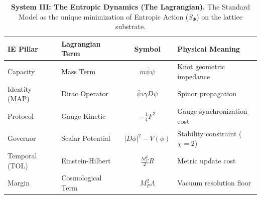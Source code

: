 \begin{table}[h]
\centering
\caption{\textbf{System III: The Entropic Dynamics (The Lagrangian).} The Standard Model as the unique minimization of Entropic Action ($S_\Phi$) on the lattice substrate.}
\label{tab:system_lagrangian}
\renewcommand{\arraystretch}{1.5}
\setlength{\tabcolsep}{6pt}
\begin{tabular}{@{} l l c l @{}}
\hline
\textbf{IE Pillar} & \textbf{Lagrangian Term} & \textbf{Symbol} & \textbf{Physical Meaning} \\
\hline
Capacity & Mass Term & $m\bar{\psi}\psi$ & Knot geometric impedance \\
Identity (MAP) & Dirac Operator & $\bar{\psi}i\gamma D\psi$ & Spinor propagation \\
Protocol & Gauge Kinetic & $-\frac{1}{4}F^2$ & Gauge synchronization cost \\
Governor & Scalar Potential & $|D\phi|^2 - V(\phi)$ & Stability constraint ($\chi=2$) \\
Temporal (TOL) & Einstein-Hilbert & $\frac{M_P^2}{2}R$ & Metric update cost \\
Margin & Cosmological Term & $M_P^2\Lambda$ & Vacuum resolution floor \\
\hline
\end{tabular}
\end{table}
